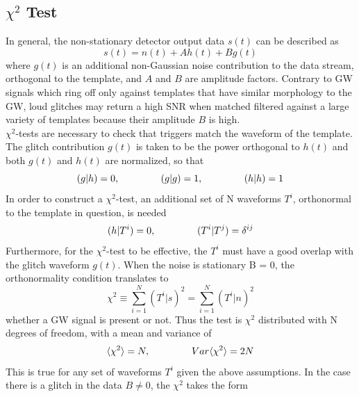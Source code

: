 \documentclass[binding=0.6cm, LaM]{sapthesis}
\begin{document}
\subsection{$\chi^2$ Test}
\label{subsec:chi_square_test}
In general, the non-stationary detector output data $s(t)$ can be described as
		\begin{equation}
			s(t) = n(t) + Ah(t) + Bg(t) 
		\end{equation}
	where $g(t)$ is an additional non-Gaussian noise contribution to the data stream, 
	orthogonal to the template, and $A$ and $B$ are amplitude factors. 
	Contrary to GW signals which ring off only against templates 
	that have similar morphology to the GW, 
	loud glitches may return a high SNR when matched filtered against a 
	large variety of templates because their amplitude $B$ is high. \\
	$\chi^2$-tests are necessary to check that triggers match the waveform of the  template.
	The glitch contribution $g(t)$ is taken to be the power orthogonal to $h(t)$ 
	and both $g(t)$ and $h(t)$ are normalized, so that 
		\begin{equation}
			(g|h)=0, \hspace*{1.5cm} (g|g)=1, \hspace*{1.5cm} (h|h)=1
		\end{equation}
	In order to construct a $\chi^2$-test, an additional set of N waveforms $T^i$, 
	orthonormal to the template in question, is needed 
		\begin{equation}
			(h|T^i)=0,  \hspace*{1.5cm} (T^i|T^j)=\delta^{ij}
		\end{equation}
	Furthermore, for the $\chi^2$-test to be effective, 
	the $T^i$ must have a good overlap with the glitch waveform $g(t)$.
	When the noise is stationary B = 0, the orthonormality condition translates to 
 		\begin{equation}
			\chi^2 \equiv \sum^N_{i=1}(T^i|s)^2 =\sum^{N}_{i=1}(T^i|n)^2
		\end{equation}
	whether a GW signal is present or not. 
	Thus the test is $\chi^2$ distributed with N degrees of freedom, 
	with a mean and variance of 
		\begin{equation}
			\langle \chi^2 \rangle = N, \hspace*{1.5cm} Var\langle \chi^2 \rangle=2N
		\end{equation}
	This is true for any set of waveforms $T^i$ given the above assumptions. 
	In the case there is a  glitch in the data $B \neq 0$, the $\chi^2$ takes the form
\end{document}
